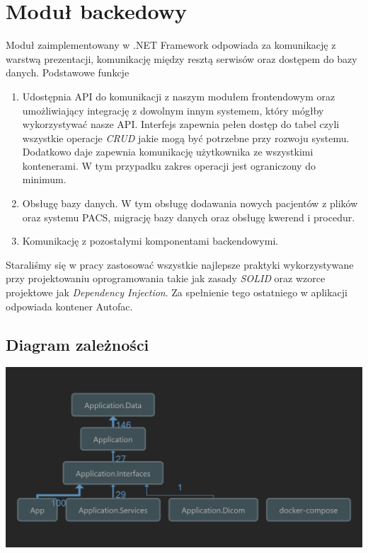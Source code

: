 \documentclass[a4paper,11pt,twoside]{report}
\theoremstyle{definition}
\begin{document}
\section{Moduł backedowy}

Moduł zaimplementowany w .NET Framework odpowiada za komunikację z warstwą prezentacji, komunikację między resztą serwisów oraz dostępem do bazy danych. Podstawowe funkcje
\begin{enumerate}
\item Udostępnia API do komunikacji z naszym modułem frontendowym oraz umożliwiający integrację z dowolnym innym systemem, który mógłby wykorzystywać nasze API. Interfejs zapewnia pełen dostęp do tabel czyli wszystkie operacje \textit{CRUD} jakie mogą być potrzebne przy rozwoju systemu. Dodatkowo daje zapewnia komunikację użytkownika ze wszystkimi kontenerami. W tym przypadku zakres operacji jest ograniczony do minimum.
\item Obsługę bazy danych. W tym obsługę dodawania nowych pacjentów z plików oraz systemu PACS, migrację bazy danych oraz obsługę kwerend i procedur.
\item Komunikację z pozostałymi komponentami backendowymi.
\end{enumerate}

Staraliśmy się w pracy zastosować wszystkie najlepsze praktyki wykorzystywane przy projektowaniu oprogramowania takie jak zasady \textit{SOLID} oraz wzorce projektowe jak \textit{Dependency Injection}. Za spełnienie tego ostatniego w aplikacji odpowiada kontener Autofac.

\subsection{Diagram zależności}
\begin{minipage}{\linewidth}
	\centering
	\includegraphics[width=\textwidth]{Backend/ApplicationDependencies.png}
\end{minipage}
\end{document}
